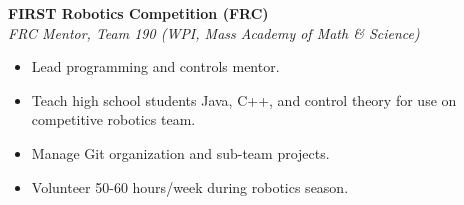 \textbf{FIRST Robotics Competition (FRC)}\\
\textit{FRC Mentor, Team 190 (WPI, Mass Academy of Math \& Science)}
\begin{itemize}
  \item Lead programming and controls mentor.
  \item Teach high school students Java, C++, and control theory for use on competitive robotics team.
  \item Manage Git organization and sub-team projects.
  \item Volunteer 50-60 hours/week during robotics season.
\end{itemize}
